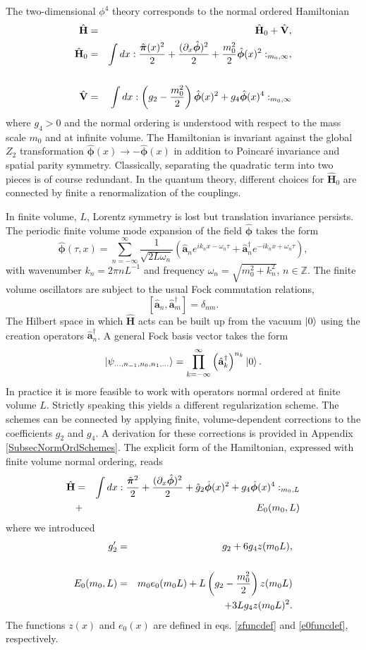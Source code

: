 \documentclass[twocolumn,secnumarabic,amssymb, nobibnotes, aps, prd]{revtex4-2}
\newcommand{\be}{\begin{equation}}
\newcommand{\ee}{\end{equation}}
\newcommand{\bea}{\begin{eqnarray}}
\newcommand{\eea}{\end{eqnarray}}
\begin{document}
The two-dimensional $\phi^4$ theory corresponds to the normal ordered Hamiltonian
\bea
\hat{\mathbf{H}}&=&\hat{\mathbf{H}}_0+\hat{\mathbf{V}},\nonumber\\
\hat{\mathbf{H}}_0&=&\intop dx :\frac{\hat{\boldsymbol{\pi}}(x)^2}{2}+\frac{(\partial_x \hat{\boldsymbol{\phi}})^2}{2}+\frac{m_0^2}{2} \hat{\boldsymbol{\phi}}(x)^2:_{m_0,\infty},\cr\cr
\hat{\mathbf{V}}&=&\intop dx :\left(g_2-\frac{m_0^2}{2}\right)\hat{\boldsymbol{\phi}}(x)^2+g_4 \hat{\boldsymbol{\phi}}(x)^4:_{m_0,\infty} \label{Vdef}
\eea
where $g_4>0$ and the normal ordering is understood with respect to the mass scale $m_0$ and at infinite volume. 
The Hamiltonian is invariant against the global $Z_2$ transformation $\hat{\boldsymbol{\phi}}(x)\rightarrow-\hat{\boldsymbol{\phi}}(x)$ in addition to Poincar\'e invariance and spatial parity symmetry.
Classically, separating the quadratic term into two pieces is of course redundant. In the quantum theory, different choices for $\hat{\mathbf{H}}_0$ are connected by finite a renormalization of the couplings.

In finite volume, $L$, Lorentz symmetry is lost but translation invariance persists. The periodic finite volume mode expansion of the field $\hat{\boldsymbol{\phi}}$ takes the form
\be
\hat{\boldsymbol{\phi}}(\tau,x)=\sum_{n=-\infty}^{\infty} \frac{1}{\sqrt{2L\omega_n}}\left(\hat{\mathbf{a}}_n e^{i k_n x-\omega_n \tau}+\hat{\mathbf{a}}_n^\dagger e^{-i k_n x+\omega_n \tau}\right),
\ee
with wavenumber $k_n=2\pi n L^{-1}$ and frequency $\omega_n=\sqrt{m_0^2+k_n^2}$, $n\in\mathbb{Z}$.
The finite volume oscillators are subject to the usual Fock commutation relations,
\be
\left[\hat{\mathbf{a}}_{n},\hat{\mathbf{a}}_{m}^{\dagger}\right] = \delta_{nm}.
\ee
The Hilbert space in which $\hat{\mathbf{H}}$ acts can be built up from the vacuum $\ket{0}$ using the creation operators $\hat{\mathbf{a}}_n^\dagger$. A general Fock basis vector takes the form
\be
\ket{\psi_{\dots,n_{-1},n_0,n_1,\dots}}=\prod_{k=-\infty}^{\infty} \left(\hat{\mathbf{a}}_k^{\dagger}\right)^{n_k}\ket{0}.
\ee
In practice it is more feasible to work with operators normal ordered at finite volume $L$. Strictly speaking this yields a different regularization scheme. The schemes can be connected by applying finite, volume-dependent corrections to the coefficients $g_2$ and $g_4$. A derivation for these corrections is provided in Appendix \ref{SubsecNormOrdSchemes}.
The explicit form of the Hamiltonian, expressed with finite volume normal ordering,
reads
\bea
\hat{\mathbf{H}}&=&\intop dx :\frac{\hat{\boldsymbol{\pi}}^2}{2}+\frac{(\partial_x \hat{\boldsymbol{\phi}})^2}{2}+\hat{g}_2 \hat{\boldsymbol{\phi}}(x)^2+g_4 \hat{\boldsymbol{\phi}}(x)^4:_{m_0,L}\nonumber\\
&+&E_0(m_0,L)\label{FiniteLH}
\eea
where we introduced
\bea
g'_2&=&g_2+6g_4 z(m_0L),\cr\cr
E_0(m_0,L)&=&m_0 e_0(m_0L)+L\left(g_2-\frac{m_0^2}{2}\right)z(m_0L) \nonumber \\
& & +3Lg_4 z(m_0L)^2. \label{E0def}
\eea
The functions $z(x)$ and $e_0(x)$ are defined in eqs. \eqref{zfuncdef} and \eqref{e0funcdef}, respectively.
\end{document}
